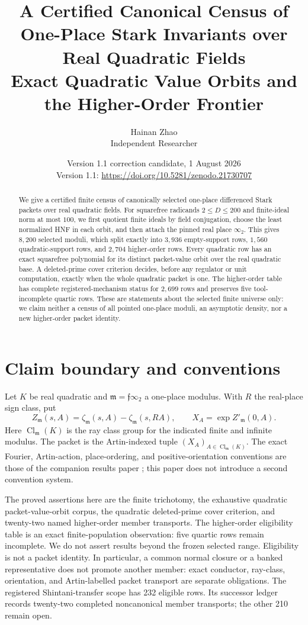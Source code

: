 \documentclass[11pt]{article}
\title{A Certified Canonical Census of One-Place Stark Invariants over Real Quadratic Fields\\
\large Exact Quadratic Value Orbits and the Higher-Order Frontier}
\author{Hainan Zhao\\\small Independent Researcher}
\date{Version 1.1 correction candidate, 1 August 2026\\
\small Version 1.1: \url{https://doi.org/10.5281/zenodo.21730707}}
\newcommand{\Cl}{\operatorname{Cl}}
\begin{document}
\maketitle

\begin{abstract}
We give a certified finite census of canonically selected one-place
differenced Stark packets over real quadratic fields.  For squarefree
radicands $2\leq D\leq200$ and finite-ideal norm at most $100$, we first
quotient finite ideals by field conjugation, choose the least normalized
HNF in each orbit, and then attach the pinned real place $\infty_2$.
This gives $8{,}200$ selected moduli, which split exactly into $3{,}936$
empty-support rows, $1{,}560$ quadratic-support rows, and $2{,}704$
higher-order rows.  Every quadratic row has an exact squarefree
polynomial for its distinct packet-value orbit over the real quadratic
base.  A deleted-prime cover criterion decides, before any regulator or
unit computation, exactly when the whole quadratic packet is one.  The
higher-order table has complete registered-mechanism status
for $2{,}699$ rows and preserves five tool-incomplete quartic rows.
These are statements about the selected finite universe only: we claim
neither a census of all pointed one-place moduli, an asymptotic density,
nor a new higher-order packet identity.
\end{abstract}

\section{Claim boundary and conventions}

Let $K$ be real quadratic and $\mathfrak m=\mathfrak f\infty_2$ a
one-place modulus.  With $R$ the real-place sign class, put
\[
 Z_{\mathfrak m}(s,A)=\zeta_{\mathfrak m}(s,A)-
 \zeta_{\mathfrak m}(s,RA),\qquad
 X_A=\exp Z'_{\mathfrak m}(0,A).
\]
Here $\Cl_{\mathfrak m}(K)$ is the ray class group for the indicated
finite and infinite modulus.  The packet is the Artin-indexed tuple
$(X_A)_{A\in\Cl_{\mathfrak m}(K)}$.
The exact Fourier, Artin-action, place-ordering, and positive-orientation
conventions are those of the companion results paper \cite{ZhaoResults};
this paper does not introduce a second convention system.

The proved assertions here are the finite trichotomy, the exhaustive
quadratic packet-value-orbit corpus, the quadratic deleted-prime cover
criterion, and twenty-two named higher-order member transports.  The
higher-order eligibility table is an exact
finite-population observation: five quartic rows remain incomplete.
We do not assert results beyond the frozen selected range.  Eligibility
is not a packet identity.  In particular, a common normal closure or a
banked representative does not promote another member: exact conductor,
ray-class, orientation, and Artin-labelled packet transport are separate
obligations.  The registered Shintani-transfer scope has 232 eligible
rows.  Its successor ledger records twenty-two completed noncanonical member
transports; the other 210 remain open.
\end{document}

